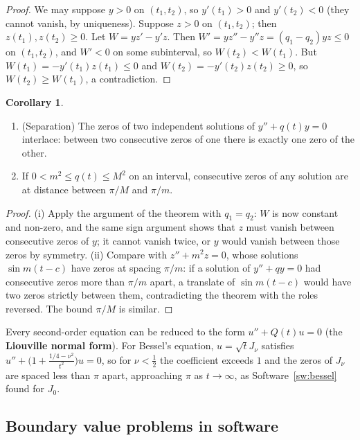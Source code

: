 \documentclass[11pt,a4paper]{article}
\numberwithin{equation}{section}
\theoremstyle{definition}
\newtheorem{coro}[thm]{Corollary}
\begin{document}
\begin{proof}
We may suppose $y > 0$ on $(t_1, t_2)$, so $y'(t_1) > 0$ and $y'(t_2) < 0$ (they cannot vanish, by uniqueness). Suppose $z > 0$ on $(t_1, t_2)$; then $z(t_1), z(t_2) \geq 0$. Let $W = yz' - y'z$. Then
$W' = yz'' - y''z = (q_1 - q_2)yz \leq 0$ on $(t_1, t_2)$, and $W' < 0$ on some subinterval, so $W(t_2) < W(t_1)$. But $W(t_1) = -y'(t_1)z(t_1) \leq 0$ and $W(t_2) = -y'(t_2)z(t_2) \geq 0$, so $W(t_2) \geq W(t_1)$, a contradiction.
\end{proof}

\begin{coro}
\label{coro:sturm}
\begin{enumerate}[label=(\roman*)]
\item (Separation) The zeros of two independent solutions of $y'' + q(t)y = 0$ interlace: between two consecutive zeros of one there is exactly one zero of the other.
\item If $0 < m^2 \leq q(t) \leq M^2$ on an interval, consecutive zeros of any solution are at distance between $\pi/M$ and $\pi/m$.
\end{enumerate}
\end{coro}

\begin{proof}
(i) Apply the argument of the theorem with $q_1 = q_2$: $W$ is now constant and non-zero, and the same sign argument shows that $z$ must vanish between consecutive zeros of $y$; it cannot vanish twice,
or $y$ would vanish between those zeros by symmetry. (ii) Compare with $z'' + m^2z = 0$, whose solutions $\sin m(t - c)$ have zeros at spacing $\pi/m$: if a solution of $y'' + qy = 0$ had consecutive zeros more than $\pi/m$
apart, a translate of $\sin m(t - c)$ would have two zeros strictly between them, contradicting the theorem with the roles reversed. The bound $\pi/M$ is similar.
\end{proof}

Every second-order equation can be reduced to the form $u'' + Q(t)u = 0$ (the \textbf{Liouville normal form}). For Bessel's equation, $u = \sqrt tJ_\nu$ satisfies $u'' + \bigl(1 + \frac{1/4 - \nu^2}{t^2}\bigr)u = 0$, so for
$\nu < \frac12$ the coefficient exceeds $1$ and the zeros of $J_\nu$ are spaced less than $\pi$ apart, approaching $\pi$ as $t \to \infty$, as Software~\ref{sw:bessel} found for $J_0$.

\subsection{Boundary value problems in software}
\label{ssec:software9}
\end{document}
